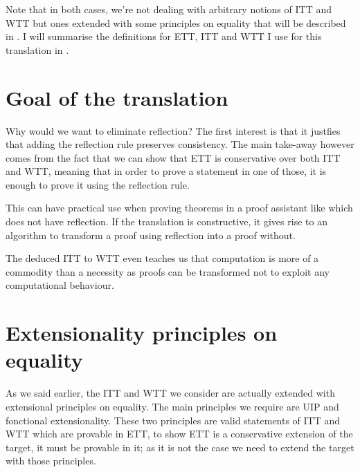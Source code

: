 Note that in both cases, we're not dealing with arbitrary notions of
\acrshort{ITT} and \acrshort{WTT} but ones extended with some principles on
equality that will be described in .
I will summarise the definitions for \acrshort{ETT}, \acrshort{ITT} and
\acrshort{WTT} I use for this translation in .

\section{Goal of the translation}

Why would we want to eliminate reflection? The first interest is that it
justfies that adding the reflection rule preserves consistency.
The main take-away however comes from the fact that we can show that
\acrshort{ETT} is conservative over both \acrshort{ITT} and \acrshort{WTT},
meaning that in order to prove a statement in one of those, it is enough
to prove it using the reflection rule.
%
%

This can have practical use when proving theorems in a proof assistant like \Coq
which does not have reflection. If the translation is constructive, it gives
rise to an algorithm to transform a proof using reflection into a proof without.

The deduced \acrshort{ITT} to \acrshort{WTT} even teaches us that computation
is more of a commodity than a necessity as proofs can be transformed not to
exploit any computational behaviour.

\section{Extensionality principles on equality}

As we said earlier, the \acrshort{ITT} and \acrshort{WTT} we consider are
actually extended with extensional principles on equality.
The main principles we require are \acrshort{UIP} and fonctional extensionality.
These two principles are valid statements of \acrshort{ITT} and \acrshort{WTT}
which are provable in \acrshort{ETT}, to show \acrshort{ETT} is a conservative
extension of the target, it must be provable in it; as it is not the case we need
to extend the target with those principles.

